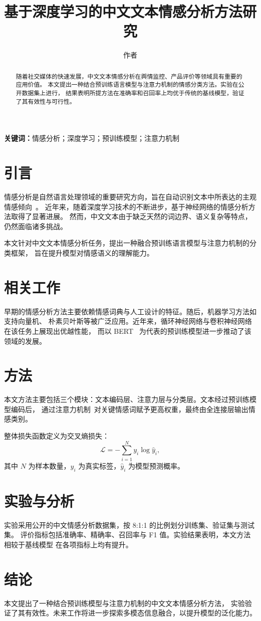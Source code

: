 \documentclass{ctexart}
\title{基于深度学习的中文文本情感分析方法研究}
\author{作者}
\begin{document}
\maketitle

\begin{abstract}
随着社交媒体的快速发展，中文文本情感分析在舆情监控、产品评价等领域具有重要的应用价值。
本文提出一种结合预训练语言模型与注意力机制的情感分类方法。实验在公开数据集上进行，
结果表明所提方法在准确率和召回率上均优于传统的基线模型，验证了其有效性与可行性。
\end{abstract}

\noindent\textbf{关键词：}情感分析；深度学习；预训练模型；注意力机制

\section{引言}

情感分析是自然语言处理领域的重要研究方向，旨在自动识别文本中所表达的主观情感倾向~\cite{karQuantitativeAnalysisHysteresis2006}。
近年来，随着深度学习技术的不断进步，基于神经网络的情感分析方法取得了显著进展。
然而，中文文本由于缺乏天然的词边界、语义复杂等特点，仍然面临诸多挑战。

本文针对中文文本情感分析任务，提出一种融合预训练语言模型与注意力机制的分类框架，
旨在提升模型对情感语义的理解能力。

\section{相关工作}

早期的情感分析方法主要依赖情感词典与人工设计的特征。随后，机器学习方法如支持向量机、
朴素贝叶斯等被广泛应用。近年来，循环神经网络与卷积神经网络在该任务上展现出优越性能，
而以 BERT~\cite{liangEvidencePseudocapacitanceFaradaic2020} 为代表的预训练模型进一步推动了该领域的发展。

\section{方法}

本文方法主要包括三个模块：文本编码层、注意力层与分类层。文本经过预训练模型编码后，
通过注意力机制~\cite{martinElectronicStructureBasic2020}对关键情感词赋予更高权重，最终由全连接层输出情感类别。

整体损失函数定义为交叉熵损失：
\begin{equation}
\mathcal{L} = -\sum_{i=1}^{N} y_i \log \hat{y}_i,
\end{equation}
其中 $N$ 为样本数量，$y_i$ 为真实标签，$\hat{y}_i$ 为模型预测概率。

\section{实验与分析}

实验采用公开的中文情感分析数据集，按 8:1:1 的比例划分训练集、验证集与测试集。
评价指标包括准确率、精确率、召回率与 F1 值。实验结果表明，本文方法相较于基线模型
在各项指标上均有提升。

\section{结论}

本文提出了一种结合预训练模型与注意力机制的中文文本情感分析方法，
实验验证了其有效性。未来工作将进一步探索多模态信息融合，以提升模型的泛化能力。

\printbibliography
\end{document}
